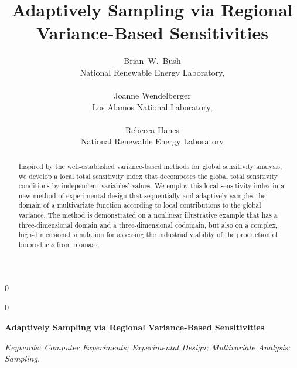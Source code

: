\documentclass[12pt]{article}
\newcommand{\blind}{0}
\begin{document}
%

\def\spacingset#1{\renewcommand{\baselinestretch}%
{#1}\small\normalsize} \spacingset{1}



\blind
{
  \title{\bf Adaptively Sampling via Regional Variance-Based Sensitivities}
  \author{
    Brian\ W.\ Bush \\
    National Renewable Energy Laboratory, \\ \\
    Joanne Wendelberger \\
    Los Alamos National Laboratory, \\ \\
    Rebecca Hanes \\
    National Renewable Energy Laboratory
  }
  \maketitle
} \fi

\blind
{
  \bigskip
  \bigskip
  \bigskip
  \begin{center}
    {\LARGE\bf Adaptively Sampling via Regional Variance-Based Sensitivities}
\end{center}
  \medskip
} \fi


\spacingset{2} %


\bigskip
\begin{abstract}
Inspired by the well-established variance-based methods for global sensitivity analysis, we develop a local total sensitivity index that decomposes the global total sensitivity conditions by independent variables' values. We employ this local sensitivity index in a new method of experimental design that sequentially and adaptively samples the domain of a multivariate function according to local contributions to the global variance. The method is demonstrated on a nonlinear illustrative example that has a three-dimensional domain and a three-dimensional codomain, but also on a complex, high-dimensional simulation for assessing the industrial viability of the production of bioproducts from biomass.
\end{abstract}

\noindent%
{\it Keywords: Computer Experiments; Experimental Design; Multivariate Analysis; Sampling.}
\vfill
\end{document}
